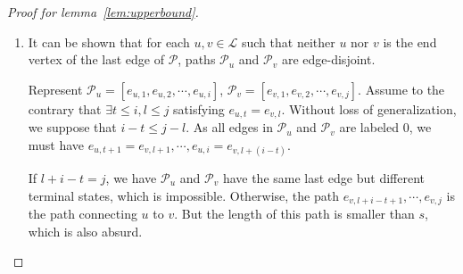 \begin{proof}[Proof for lemma~\ref{lem:upperbound}]
\begin{enumerate}
            If $l=s-j$, the proof is done. Otherwise, it's obvious that $$a_{l}\cdots a_{2}a_{1}0^{j}1x1_{t}0^{s-l}$$ is balance, hence, by claim \ref{claim:balance_ver}, it also has at least $1$ in-edge not lying in $\mathscr{P}$, and one can continue adding such edge to the head of $\mathcal{P}_{v}$.
            
        \item It can be shown that for each $u,v\in\mathscr{L}$ such that neither $u$ nor $v$ is the end vertex of the last edge of $\mathscr{P}$, paths $\mathcal{P}_{u}$ and $\mathcal{P}_{v}$ are edge-disjoint.
    
            Represent $\mathcal{P}_{u} = [e_{u,1},e_{u,2},\cdots,e_{u,i}]$, $\mathcal{P}_{v}=[e_{v,1},e_{v,2},\cdots,e_{v,j}]$. Assume to the contrary that $\exists t\leq i,l\leq j$ satisfying $e_{u,t}=e_{v,l}$. Without loss of generalization, we suppose that $i-t\leq j-l$. As all edges in $\mathcal{P}_{u}$ and $\mathcal{P}_{v}$ are labeled $0$, we must have $e_{u,t+1}=e_{v,l+1},\cdots,e_{u,i}=e_{v,l+(i-t)}$. 
            
            If $l+i-t=j$, we have $\mathcal{P}_{u}$ and $\mathcal{P}_{v}$ have the same last edge but different terminal states, which is impossible. Otherwise, the path $e_{v,l+i-t+1},\cdots,e_{v,j}$ is the path connecting $u$ to $v$. But the length of this path is smaller than $s$, which is also absurd.
    \end{enumerate}
    
    
    
    

\end{proof}
